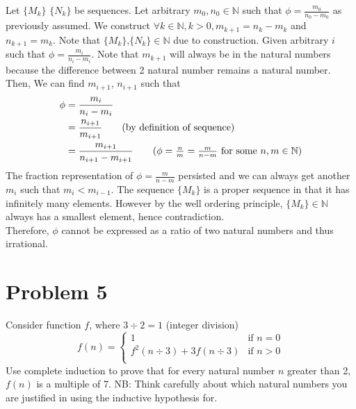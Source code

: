 \documentclass[11pt]{article}
\theoremstyle{plain}%
\theoremstyle{definition}
\theoremstyle{remark}
\newcommand{\N}{\mathbb{N}}
\begin{document}
\begin{enumerate}[label=\alph*]
  Let $\{ M_k\}$ $\{ N_k\}$ be sequences. Let arbitrary $m_0, n_0\in\N$ such that $\phi = \frac{m_0}{n_0-m_0}$ as previously assumed. We construct $\forall k\in\N, k> 0, m_{k+1} = n_{k} - m_{k}$ and $n_{k+1} = m_{k}$. Note that $\{ M_k\}$,$\{ N_k\}\in\N$ due to construction. Given arbitrary $i$ such that $\phi = \frac{m_i}{n_i - m_i}$. Note that $m_{k+1}$ will always be in the natural numbers because the difference between 2 natural number remains a natural number. Then, We can find $m_{i+1}$, $n_{i+1}$ such that
  \begin{align*}
    \phi &= \frac{m_i}{n_i - m_i}\\
    &= \frac{n_{i+1}}{m_{i+1}}\tag{by definition of sequence}\\
    &= \frac{m_{i+1}}{n_{i+1} - m_{i+1}} \tag{$\phi = \frac{n}{m} = \frac{m}{n-m}$ for some $n,m\in\N$}
  \end{align*}
  The fraction representation of $\phi = \frac{m}{n-m}$ persisted and we can always get another $m_i$ such that $m_i < m_{i-1}$. The sequence $\{ M_k\}$ is a proper sequence in that it has infinitely many elements. However by the well ordering principle, $\{ M_k\}\in\N$ always has a smallest element, hence contradiction.
  \\
  Therefore, $\phi$ cannot be expressed as a ratio of two natural numbers and thus irrational.

\end{enumerate}



\section*{Problem 5}
Consider function $f$, where $3 \div 2 = 1$ (integer division)
\[
  f(n) =
  \begin{cases}
    1 &\text{if $n=0$}\\
    f^2(n \div 3) + 3f(n \div 3)&\text{if $n>0$}\\
  \end{cases}
\]
Use complete induction to prove that for every natural number $n$ greater than 2, $f(n)$ is a multiple of 7. NB: Think carefully about which natural numbers you are justified in using the inductive hypothesis for.
\end{document}
